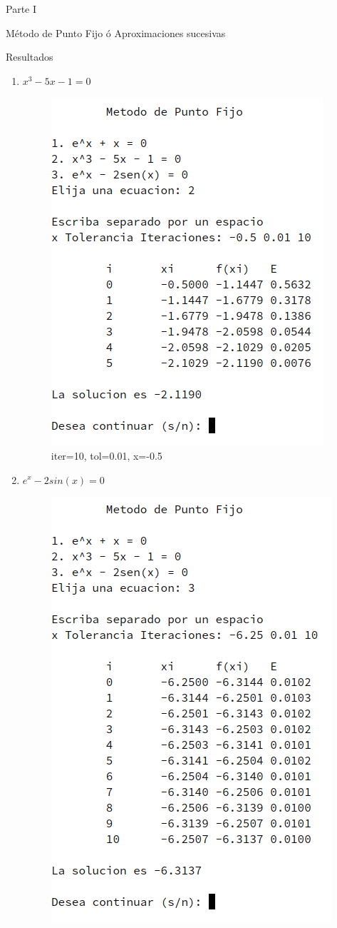 \documentclass[legalpaper, 12pt]{article}
\def \eqb {\(x^3 - 5x - 1 = 0\)}
\def \eqc {\(e^x - 2sin(x) = 0\)}
\begin{document}
\begin{section}{Parte I}
\begin{subsection}{Método de Punto Fijo ó Aproximaciones sucesivas}
\begin{subsubsection}{Resultados}
\begin{enumerate}
          \item \eqb
          \begin{figure}[h]
            \centering
            \includegraphics[scale=0.72]{pto2.png}
            \caption{iter=10, tol=0.01, x=-0.5}
          \end{figure}
          \newpage
          \item \eqc
          \begin{figure}[h]
            \centering
            \includegraphics[scale=0.8]{pto3.png}

\end{figure}
\end{enumerate}
\end{subsubsection}
\end{subsection}
\end{section}
\end{document}
